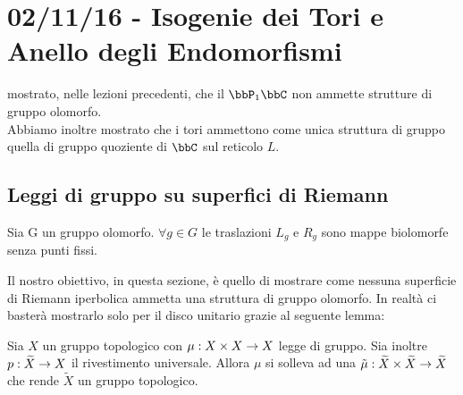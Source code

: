 
\chapter{02/11/16 - Isogenie dei Tori e Anello degli Endomorfismi}
\justify

  mostrato, nelle lezioni precedenti, che il $ \bbP_{1}\bbC $ non ammette strutture di gruppo olomorfo. \\
Abbiamo inoltre mostrato che i tori ammettono come unica struttura di gruppo quella di gruppo quoziente di $\bbC$ sul reticolo $L$.\\


\section{Leggi di gruppo su superfici di Riemann}
\begin{osservazione}
Sia G un gruppo olomorfo. $\forall g \in G$ le traslazioni $L_{g}$ e $R_{g}$ sono mappe biolomorfe senza punti fissi. 
\end{osservazione}

\noindent Il nostro obiettivo, in questa sezione, è quello di mostrare come nessuna superficie di Riemann iperbolica ammetta una struttura di gruppo olomorfo. In realtà ci basterà mostrarlo solo per il disco unitario grazie al seguente lemma:
\begin{lemma}
Sia $X$ un gruppo topologico con $\mu : X\times X \rightarrow X$ legge di gruppo. Sia inoltre $p :\widetilde{X} \rightarrow X$ il rivestimento universale.
Allora $\mu$ si solleva ad una $\tilde{\mu} : \widetilde{X} \times \widetilde{X} \rightarrow \widetilde{X}$ che rende $\widetilde{X}$ un gruppo topologico.
\end{lemma}

